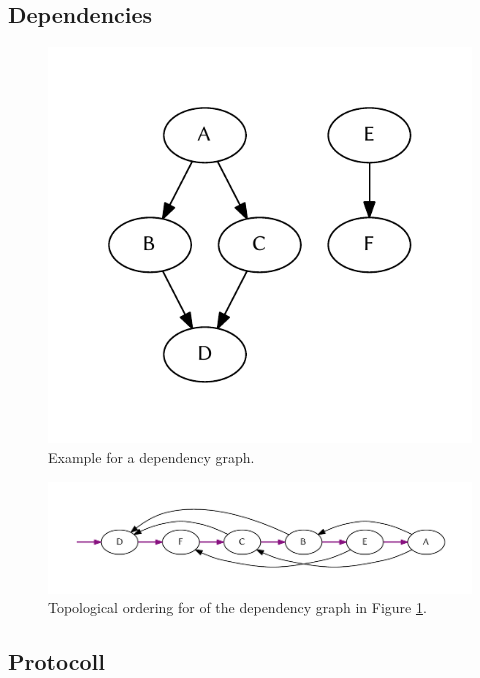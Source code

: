 	\subsection{Dependencies}
	\begin{figure}[!htb]
		\centering
		\includegraphics[width=.4474\textwidth]{figures/unordered-graph.pdf} %
		\caption{\label{fig:graph:unordered} Example for a dependency graph.}
	\end{figure}
	\begin{figure}[!htb]
		\centering
		\includegraphics[width=1\textwidth]{figures/ordered-graph.pdf} %
		\caption{\label{fig:graph:ordered} Topological ordering for of the dependency graph in Figure \ref{fig:graph:unordered}.}
	\end{figure}

	\subsection{Protocoll}
